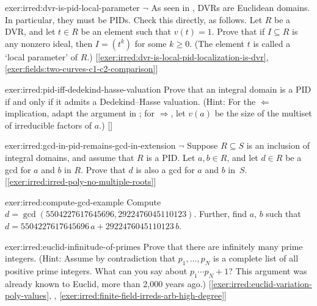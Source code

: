 \begin{exer}{}{exer:irred:dvr-is-pid-local-parameter}
  $\lnot$ As seen in ,
  DVRs are Euclidean domains. In particular, they must be PIDs. Check
  this directly, as follows. Let $R$ be a DVR, and let $t \in R$ be an
  element such that $v(t) = 1$. Prove that if $I \subseteq R$ is any
  nonzero ideal, then $I = (t^k)$ for some $k \geq 0$. (The element
  $t$ is called a `local parameter' of $R$.)
  [\ref{exer:irred:dvr-is-local-pid-localization-is-dvr},
  \ref{exer:fields:two-curves-c1-c2-comparison}]
\end{exer}
\begin{exer}{}{exer:irred:pid-iff-dedekind-hasse-valuation}
  \exerused{} Prove that an integral domain is a PID if and only if it
  admits a Dedekind--Hasse valuation. (Hint: For the $\Leftarrow$
  implication, adapt the argument in ; for
  $\Rightarrow$, let $v(a)$ be the size of the multiset of irreducible
  factors of $a$.)
  []
\end{exer}
\begin{exer}{}{exer:irred:gcd-in-pid-remains-gcd-in-extension}
  $\lnot$ Suppose $R \subseteq S$ is an inclusion of integral domains,
  and assume that $R$ is a PID. Let $a, b \in R$, and let $d \in R$ be
  a gcd for $a$ and $b$ in $R$. Prove that $d$ is also a gcd for $a$
  and $b$ in~$S$. [\ref{exer:irred:irred-poly-no-multiple-roots}]
\end{exer}
\begin{exer}{}{exer:irred:compute-gcd-example}
  Compute $d = \gcd(5504227617645696, 2922476045110123)$. Further,
  find $a$, $b$ such that
  $d = 5504227617645696\, a + 2922476045110123\, b$.
\end{exer}

\begin{exer}{}{exer:irred:euclid-infinitude-of-primes}
  Prove that there are infinitely many prime integers. (Hint: Assume
  by contradiction that $p_1, \dots, p_N$ is a complete list of all
  positive prime integers. What can you say about
  $p_1 \cdots p_N + 1$? This argument was already known to Euclid,
  more than 2,000 years ago.)
  [\ref{exer:irred:euclid-variation-poly-values},
  ,
  \ref{exer:irred:finite-field-irreds-arb-high-degree}]
\end{exer}

